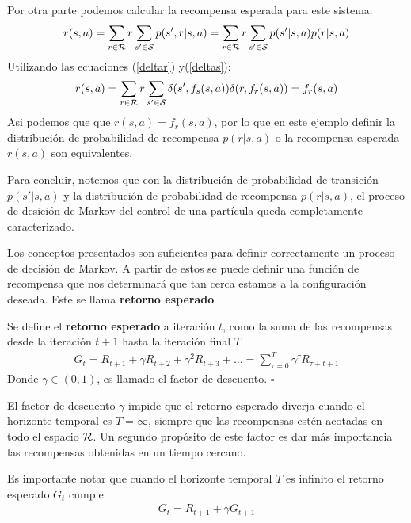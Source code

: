 \begin{example}
    Por otra parte podemos calcular la recompensa esperada para este sistema:
    \begin{gather}
        r(s,a) = \sum_{r\in \mathcal{R}} r \sum_{s'\in\mathcal{S}} p(s',r|s,a) =         \sum_{r\in \mathcal{R}} r \sum_{s'\in\mathcal{S}} p(s'|s,a) p(r|s,a) 
    \end{gather}
    Utilizando las ecuaciones (\ref{deltar}) y(\ref{deltas}):    
    \begin{gather}
        r(s,a) = \sum_{r\in \mathcal{R}} r \sum_{s'\in\mathcal{S}} \delta(s',f_s(s,a)) \delta(r,f_r(s,a)) = f_r(s,a)  
    \end{gather}
    Asi podemos que que  $r(s,a) = f_r(s,a)$, por lo que en este ejemplo definir la distribución de probabilidad de recompensa $p(r|s,a)$ o la recompensa esperada $r(s,a)$ son equivalentes.
    
    Para concluir, notemos que con la distribución de probabilidad de transición $p(s'|s,a)$ y la distribución de probabilidad de recompensa $p(r|s,a)$, el proceso de desición de Markov del control de una partícula queda completamente caracterizado.

\end{example}

Los conceptos presentados son suficientes para definir correctamente un proceso de decisión de Markov. A partir de estos se puede definir una función de recompensa que nos determinará que tan cerca estamos a la configuración deseada. Este se llama \textbf{retorno esperado} 

\begin{defi}
Se define el \textbf{retorno esperado} a iteración $t$, como la suma de las recompensas desde la iteración $t+1$ hasta la iteración final $T$
\begin{gather}
    G_t = R_{t+1} + \gamma R_{t+2} + \gamma^2 R_{t+3} + \dots =\sum_{\tau= 0}^T \gamma^\tau R_{\tau+t+1}
\end{gather}
Donde $\gamma \in (0,1)$, es llamado el factor de descuento.
\hfill\ensuremath{\square}
\end{defi} 

\begin{obs}
    El factor de descuento $\gamma$ impide que el retorno esperado diverja cuando el horizonte temporal es $T=\infty$, siempre que las recompensas estén acotadas en todo el espacio $\mathcal{R}$. Un segundo propósito de este factor es dar más importancia las recompensas obtenidas en un tiempo cercano. 
\end{obs}
\begin{obs}
    Es importante notar que cuando el horizonte temporal $T$ es infinito el retorno esperado $G_t$ cumple:
    \begin{gather}\label{Gttt}
        G_t = R_{t+1} + \gamma G_{t+1}
    \end{gather}
\end{obs}

